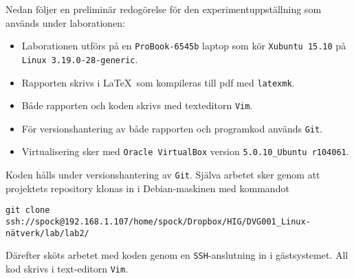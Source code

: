 Nedan följer en preliminär redogörelse för den experimentuppställning som används
under laborationen:

\begin{itemize}
  \item Laborationen utförs på en \texttt{ProBook-6545b} laptop som kör
        \texttt{Xubuntu 15.10} på \texttt{Linux 3.19.0-28-generic}.

  \item Rapporten skrivs i \LaTeX\  som kompileras till pdf med \texttt{latexmk}.

  \item Både rapporten och koden skrivs med texteditorn \texttt{Vim}.

  \item För versionshantering av både rapporten och programkod används \texttt{Git}.

  \item Virtualisering sker med \texttt{Oracle VirtualBox} version
        \texttt{5.0.10\_Ubuntu r104061}.
\end{itemize}

Koden hålls under versionshantering av \texttt{Git}. Själva arbetet sker genom att 
projektets repository klonas in i Debian-maskinen med kommandot 
\begin{verbatim}
git clone ssh://spock@192.168.1.107/home/spock/Dropbox/HIG/DVG001_Linux-nätverk/lab/lab2/
\end{verbatim}

Därefter sköts arbetet med koden genom en \texttt{SSH}-anslutning in i gästsystemet.
All kod skrivs i text-editorn \texttt{Vim}.

